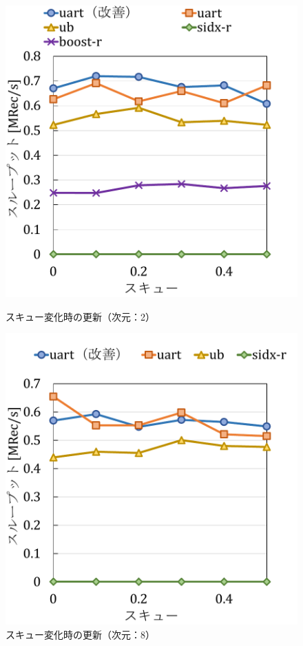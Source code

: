 \begin{figure}[tb]
  \begin{minipage}[c]{0.495\textwidth}
    \centering
    \includegraphics[scale=0.5]{./figures/graph-skew-update-2.pdf}
    \caption{スキュー変化時の更新（次元：2）}
    \label{graph:grouped}
  \end{minipage}
  \begin{minipage}[c]{0.495\textwidth}
    \centering
    \includegraphics[scale=0.5]{./figures/graph-skew-update-8.pdf}
    \caption{スキュー変化時の更新（次元：8）}
    \label{graph:paired}
  \end{minipage}
\end{figure}

